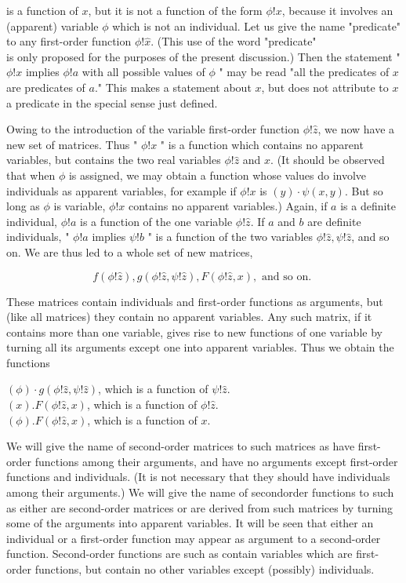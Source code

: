 \documentclass[10pt]{article}
\begin{document}
is a function of $x$, but it is not a function of the form $\phi!x$, because it involves an (apparent) variable $\phi$ which is not an individual. Let us give the name "predicate" to any first-order function $\phi!\hat{x}$. (This use of the word "predicate"\\
is only proposed for the purposes of the present discussion.) Then the statement " $\phi!x$ implies $\phi!a$ with all possible values of $\phi$ " may be read "all the predicates of $x$ are predicates of $a$." This makes a statement about $x$, but does not attribute to $x$ a predicate in the special sense just defined.

Owing to the introduction of the variable first-order function $\phi!\hat{z}$, we now have a new set of matrices. Thus " $\phi!x$ " is a function which contains no apparent variables, but contains the two real variables $\phi!\hat{z}$ and $x$. (It should be observed that when $\phi$ is assigned, we may obtain a function whose values do involve individuals as apparent variables, for example if $\phi!x$ is $(y) \cdot \psi(x, y)$. But so long as $\phi$ is variable, $\phi!x$ contains no apparent variables.) Again, if $a$ is a definite individual, $\phi!a$ is a function of the one variable $\phi!\hat{z}$. If $a$ and $b$ are definite individuals, " $\phi!a$ implies $\psi!b$ " is a function of the two variables $\phi!\hat{z}, \psi!\hat{z}$, and so on. We are thus led to a whole set of new matrices,

$$
f(\phi!\hat{z}), g(\phi!\hat{z}, \psi!\hat{z}), F(\phi!\hat{z}, x), \text { and so on. }
$$

These matrices contain individuals and first-order functions as arguments, but (like all matrices) they contain no apparent variables. Any such matrix, if it contains more than one variable, gives rise to new functions of one variable by turning all its arguments except one into apparent variables. Thus we obtain the functions

\begin{displayquote}
$(\phi) \cdot g(\phi!\hat{z}, \psi!\hat{z})$, which is a function of $\psi!\hat{z}$.\\
$(x) . F(\phi!\hat{z}, x)$, which is a function of $\phi!\hat{z}$.\\
$(\phi) . F(\phi!\hat{z}, x)$, which is a function of $x$.
\end{displayquote}

We will give the name of second-order matrices to such matrices as have first-order functions among their arguments, and have no arguments except first-order functions and individuals. (It is not necessary that they should have individuals among their arguments.) We will give the name of secondorder functions to such as either are second-order matrices or are derived from such matrices by turning some of the arguments into apparent variables. It will be seen that either an individual or a first-order function may appear as argument to a second-order function. Second-order functions are such as contain variables which are first-order functions, but contain no other variables except (possibly) individuals.
\end{document}
